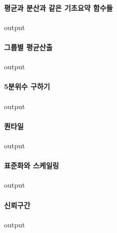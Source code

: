 \documentclass{book}
\begin{document}
\paragraph{평균과 분산과 같은 기초요약 함수들}
\begin{Schunk}
\begin{Soutput}
output
\end{Soutput}
\end{Schunk}

\paragraph{그룹별 평균산출}
\begin{Schunk}
\begin{Soutput}
output
\end{Soutput}
\end{Schunk}

\paragraph{5분위수 구하기}
\begin{Schunk}
\begin{Soutput}
output
\end{Soutput}
\end{Schunk}

\paragraph{퀀타일}
\begin{Schunk}
\begin{Soutput}
output
\end{Soutput}
\end{Schunk}

\paragraph{표준화와 스케일링}
\begin{Schunk}
\begin{Soutput}
output
\end{Soutput}
\end{Schunk}

\paragraph{신뢰구간}
\begin{Schunk}
\begin{Soutput}
output
\end{Soutput}
\end{Schunk}
\end{document}
